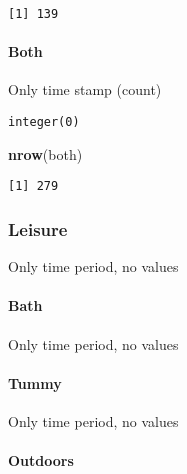 \documentclass[10,portrait]{article}
\newenvironment{Shaded}{\begin{snugshade}}{\end{snugshade}}
\newcommand{\KeywordTok}[1]{\textcolor[rgb]{0.13,0.29,0.53}{\textbf{#1}}}
\newcommand{\CommentTok}[1]{\textcolor[rgb]{0.56,0.35,0.01}{\textit{#1}}}
\newcommand{\OperatorTok}[1]{\textcolor[rgb]{0.81,0.36,0.00}{\textbf{#1}}}
\newcommand{\NormalTok}[1]{#1}
\let\oldparagraph\paragraph
\renewcommand{\paragraph}[1]{\oldparagraph{#1}\mbox{}}
\begin{document}
\begin{verbatim}
[1] 139
\end{verbatim}

\paragraph{Both}\label{both}

Only time stamp (count)

\begin{Shaded}
\end{Shaded}

\begin{verbatim}
integer(0)
\end{verbatim}

\begin{Shaded}
\begin{Highlighting}[]
\KeywordTok{nrow}\NormalTok{(both)}
\end{Highlighting}
\end{Shaded}

\begin{verbatim}
[1] 279
\end{verbatim}

\subsubsection{Leisure}\label{leisure}

Only time period, no values

\paragraph{Bath}\label{bath}

Only time period, no values

\paragraph{Tummy}\label{tummy}

Only time period, no values

\paragraph{Outdoors}\label{outdoors}
\end{document}
